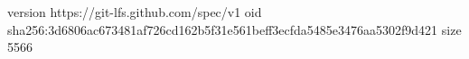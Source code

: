 version https://git-lfs.github.com/spec/v1
oid sha256:3d6806ac673481af726cd162b5f31e561beff3ecfda5485e3476aa5302f9d421
size 5566
